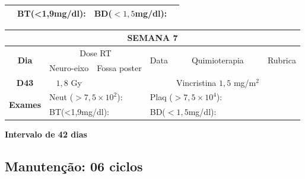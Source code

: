 \documentclass[11pt,a4paper,oldfontcommands]{memoir}
\begin{document}
\begin{center}
\begin{longtable}{p{1cm}p{2cm}|p{2cm}|p{1cm}|p{4cm}|p{3cm}}
    \cline{2-6}
    \multicolumn{1}{c|}{\multirow{2}{*}{{}}}&\multicolumn{2}{l|}{BT(<1,9mg/dl):}&\multicolumn{2}{l|}{BD(\(<1,5\)mg/dl):}&
    \\
    \hline
\end{longtable}
\begin{longtable}{p{1cm}p{2cm}|p{2cm}|p{1cm}|p{4cm}|p{3cm}}
	\hline
	\multicolumn{6}{c}{\textbf{SEMANA 7}}\\
\hline
    \multicolumn{1}{c|}{\multirow{2}{*}{\textbf{Dia}}}&\multicolumn{2}{c|}{Dose RT}&\multicolumn{1}{c|}{\multirow{2}{*}{Data}}&\multicolumn{1}{c|}{\multirow{2}{*}{Quimioterapia}}&\multicolumn{1}{c}{\multirow{2}{*}{Rubrica}} \\
    \cline{2-3}
    \multicolumn{1}{c|}{\multirow{1}{*}{}}&{Neuro-eixo}&{Fossa poster}&& \\
	\hline
	\multicolumn{1}{c|}{\multirow{1}{*}{\textbf{D43}}}&\multicolumn{1}{c|}{\(1,8\) Gy}&&&{Vincristina \(1,5\) mg/m\(^2\)}&\\
    \hline
    \multicolumn{1}{c|}{\multirow{2}{*}{\textbf{Exames}}}&\multicolumn{2}{l|}{Neut (\(>7,5\times10^2\)):}&\multicolumn{2}{l|}{Plaq (\(>7,5\times10^4\)):}&\\
    \cline{2-6}
    \multicolumn{1}{c|}{\multirow{2}{*}{{}}}&\multicolumn{2}{l|}{BT(<1,9mg/dl):}&\multicolumn{2}{l|}{BD(\(<1,5\)mg/dl):}&
    \\
    \hline
\end{longtable}
\textbf{Intervalo de 42 dias}\\
\end{center}

\subsection{Manutenção: 06 ciclos}
\end{document}
